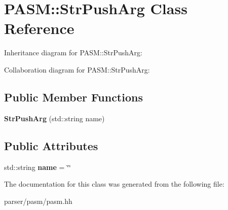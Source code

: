 \hypertarget{classPASM_1_1StrPushArg}{}\section{P\+A\+SM\+:\+:Str\+Push\+Arg Class Reference}
\label{classPASM_1_1StrPushArg}


Inheritance diagram for P\+A\+SM\+:\+:Str\+Push\+Arg\+:


Collaboration diagram for P\+A\+SM\+:\+:Str\+Push\+Arg\+:
\subsection*{Public Member Functions}
\begin{DoxyCompactItemize}
\item 
\mbox{\label{classPASM_1_1StrPushArg_a14a17d34ff48d86c39fea9bf68ab7544}} 
{\bfseries Str\+Push\+Arg} (std\+::string name)
\end{DoxyCompactItemize}
\subsection*{Public Attributes}
\begin{DoxyCompactItemize}
\item 
\mbox{\label{classPASM_1_1StrPushArg_a700be586efa741418bdaaff91aee8887}} 
std\+::string {\bfseries name} = \char`\"{}\char`\"{}
\end{DoxyCompactItemize}


The documentation for this class was generated from the following file\+:\begin{DoxyCompactItemize}
\item 
parser/pasm/pasm.\+hh\end{DoxyCompactItemize}
